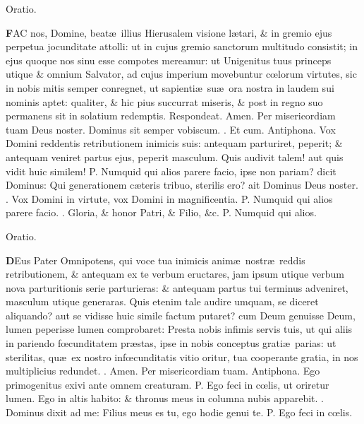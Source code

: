 \documentclass[letter,11pt]{book}
\makeatletter
\DeclareRobustCommand{\Vbar}{\vers@resp{-0.1em}{V}}
\DeclareRobustCommand{\Rbar}{\vers@resp{0pt}{R}}
\newcommand{\vers@resp@sym}{\raisebox{0.2ex}{\rotatebox[origin=c]{-20}{$\m@th\rceil$}}}
\newcommand{\vers@resp}[2]{%
  {\ooalign{\hidewidth\kern#1\vers@resp@sym\hidewidth\cr#2\cr}}%
}%
\def\P{\color{Red} P. \color{black}}
\def\V{\color{Red} \Vbar . \color{black}}
\def\R{\color{Red} \Rbar . \color{black}}
\makeatother
\begin{document}
\begin{multicols*}{2}
\vspace{-.5em} \begin{center} \color{Red} Oratio. \color{black} \end{center} \vspace{-.5em}
\lettrine[lines=2]{\bfseries \color{Red} F}{}AC nos, Domine, beat\ae \ illius Hierusalem visione l\ae tari, \& in gremio ejus perpetua jocunditate attolli: ut in cujus gremio sanctorum multitudo consistit; in ejus quoque nos sinu esse compotes mereamur: ut Unigenitus tuus princeps utique \& omnium Salvator, ad cujus imperium movebuntur c\oe lorum virtutes, sic in nobis mitis semper conregnet, ut sapienti\ae \ su\ae \ ora nostra in laudem sui nominis aptet: qualiter, \& hic pius succurrat miseris, \& post in regno suo permanens sit in solatium redemptis. \color{Red} Respondeat. \color{black} Amen. Per misericordiam tuam Deus noster. Dominus sit semper vobiscum. \R Et cum.
\newline \color{Red} Antiphona. \color{black} Vox Domini reddentis retributionem inimicis suis: antequam parturiret, peperit; \& antequam veniret partus ejus, peperit masculum. Quis audivit talem! aut quis vidit huic similem! \P Numquid qui alios parere facio, ipse non pariam? dicit Dominus: Qui generationem c\ae teris tribuo, sterilis ero? ait Dominus Deus noster. \V Vox Domini in virtute, vox Domini in magnificentia. \P Numquid qui alios parere facio. \V Gloria, \& honor Patri, \& Filio, \&c. \P Numquid qui alios.
\vspace{-.5em} \begin{center} \color{Red} Oratio. \color{black} \end{center} \vspace{-.5em}
\lettrine[lines=2]{\bfseries \color{Red} D}{}Eus Pater Omnipotens, qui voce tua inimicis anim\ae \ nostr\ae \ reddis retributionem, \& antequam ex te verbum eructares, jam ipsum utique verbum nova parturitionis serie parturieras: \& antequam partus tui terminus adveniret, masculum utique generaras. Quis etenim tale audire umquam, se diceret aliquando? aut se vidisse huic simile factum putaret? cum Deum genuisse Deum, lumen peperisse lumen comprobaret: Presta nobis infimis servis tuis, ut qui aliis in pariendo f\oe cunditatem pr\ae stas, ipse in nobis conceptus grati\ae \ parias: ut sterilitas, qu\ae \ ex nostro inf\oe cunditatis vitio oritur, tua cooperante gratia, in nos multiplicius redundet. \R Amen. Per misericordiam tuam.
\newline \color{Red} Antiphona. \color{black} Ego primogenitus exivi ante omnem creaturam. \P Ego feci in c\oe lis, ut oriretur lumen. Ego in altis habito: \& thronus meus in columna nubis apparebit. \V Dominus dixit ad me: Filius meus es tu, ego hodie genui te. \P Ego feci in c\oe lis.

\end{multicols*}
\end{document}
